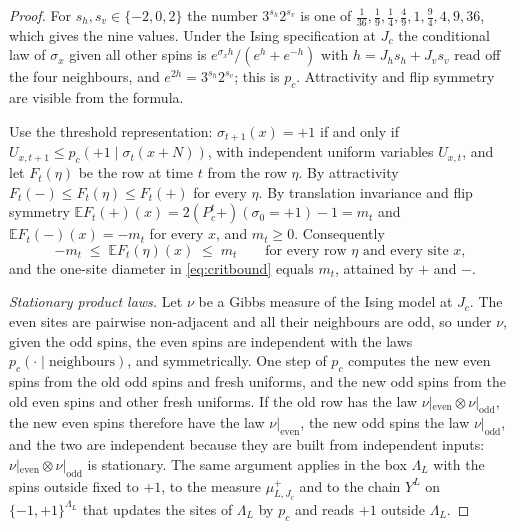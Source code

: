 \documentclass[11pt]{article}
\theoremstyle{plain}
\theoremstyle{definition}
\theoremstyle{remark}
\newcommand{\E}{\mathbb{E}}
\newcommand{\Lam}{\Lambda}
\begin{document}
\begin{proof}
For $s_h,s_v\in\{-2,0,2\}$ the number $3^{s_h}2^{s_v}$ is one of $\frac1{36},\frac19,\frac14,\frac49,1,\frac94,4,9,36$, which gives the nine values. Under the Ising specification at $J_c$ the conditional law of $\sigma_x$ given all other spins is $e^{\sigma_xh}/(e^h+e^{-h})$ with $h=J_hs_h+J_vs_v$ read off the four neighbours, and $e^{2h}=3^{s_h}2^{s_v}$; this is $p_c$. Attractivity and flip symmetry are visible from the formula.

Use the threshold representation: $\sigma_{t+1}(x)=+1$ if and only if $U_{x,t+1}\le p_c(+1\mid\sigma_t(x+N))$, with independent uniform variables $U_{x,t}$, and let $F_t(\eta)$ be the row at time $t$ from the row $\eta$. By attractivity $F_t(\mathbf-)\le F_t(\eta)\le F_t(\mathbf+)$ for every $\eta$. By translation invariance and flip symmetry $\E F_t(\mathbf+)(x)=2(P_c^t\mathbf+)(\sigma_0=+1)-1=m_t$ and $\E F_t(\mathbf-)(x)=-m_t$ for every $x$, and $m_t\ge0$. Consequently
\begin{equation}
-m_t\;\le\;\E F_t(\eta)(x)\;\le\;m_t\qquad\text{for every row }\eta\text{ and every site }x,
\label{eq:sandwich}
\end{equation}
and the one-site diameter in \eqref{eq:critbound} equals $m_t$, attained by $\mathbf+$ and $\mathbf-$.

\emph{Stationary product laws.} Let $\nu$ be a Gibbs measure of the Ising model at $J_c$. The even sites are pairwise non-adjacent and all their neighbours are odd, so under $\nu$, given the odd spins, the even spins are independent with the laws $p_c(\cdot\mid\text{neighbours})$, and symmetrically. One step of $p_c$ computes the new even spins from the old odd spins and fresh uniforms, and the new odd spins from the old even spins and other fresh uniforms. If the old row has the law $\nu|_{\mathrm{even}}\otimes\nu|_{\mathrm{odd}}$, the new even spins therefore have the law $\nu|_{\mathrm{even}}$, the new odd spins the law $\nu|_{\mathrm{odd}}$, and the two are independent because they are built from independent inputs: $\nu|_{\mathrm{even}}\otimes\nu|_{\mathrm{odd}}$ is stationary. The same argument applies in the box $\Lam_L$ with the spins outside fixed to $+1$, to the measure $\mu^+_{L,J_c}$ and to the chain $Y^L$ on $\{-1,+1\}^{\Lam_L}$ that updates the sites of $\Lam_L$ by $p_c$ and reads $+1$ outside $\Lam_L$.


\end{proof}
\end{document}
